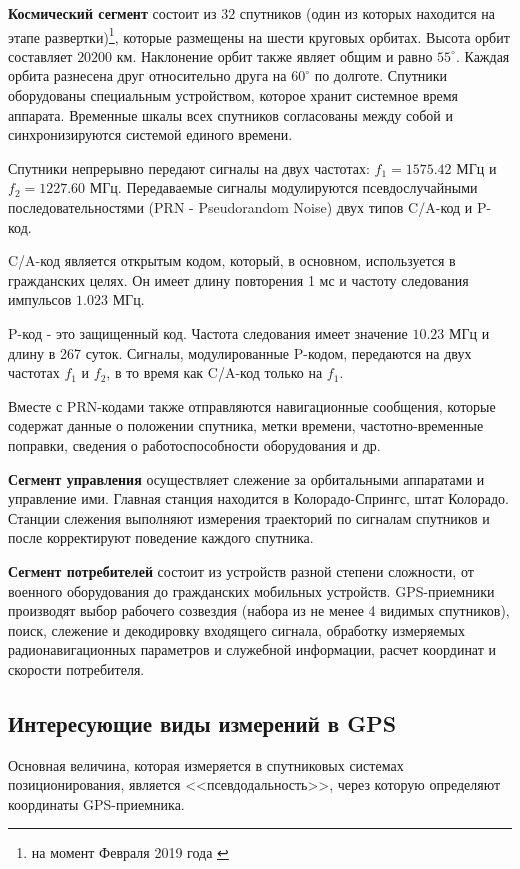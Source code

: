 \documentclass[a4paper]{article}
\begin{document}
\textbf{Космический сегмент} состоит из $32$ спутников (один из которых находится на этапе развертки)\footnote{на момент Февраля 2019 года \cite{gpsgov}}, которые размещены на шести круговых орбитах. Высота орбит составляет $20200$ км. Наклонение орбит также являет общим и равно $55^{\circ}$. Каждая орбита разнесена друг относительно друга на $60^{\circ}$ по долготе. Спутники оборудованы специальным устройством, которое хранит системное время аппарата. Временные шкалы всех спутников согласованы между собой и синхронизируются системой единого времени.

Спутники непрерывно передают сигналы на двух частотах: $f_1 = 1575.42 \text{ МГц}$ и $f_2 = 1227.60 \text{ МГц}$. Передаваемые сигналы модулируются псевдослучайными последовательностями (PRN - Pseudorandom Noise) двух типов C/A-код и P-код.

C/A-код является открытым кодом, который, в основном, используется в гражданских целях. Он имеет длину повторения 1 мс и частоту следования импульсов $1.023 \text{ МГц}$.

P-код - это защищенный код. Частота следования имеет значение $10.23 \text{ МГц}$ и длину в 267 суток. Сигналы, модулированные P-кодом, передаются на двух частотах $f_1$ и $f_2$, в то время как C/A-код только на $f_1$.

Вместе с PRN-кодами также отправляются навигационные сообщения, которые содержат данные о положении спутника, метки времени, частотно-временные поправки, сведения о работоспособности оборудования и др.

\textbf{Сегмент управления} осуществляет слежение за орбитальными аппаратами и управление ими. Главная станция находится в Колорадо-Спрингс, штат Колорадо. Станции слежения выполняют измерения траекторий по сигналам спутников и после корректируют поведение каждого спутника.

\textbf{Сегмент потребителей} состоит из устройств разной степени сложности, от военного оборудования до гражданских мобильных устройств. GPS-приемники производят выбор рабочего созвездия (набора из не менее 4 видимых спутников), поиск, слежение и декодировку входящего сигнала, обработку измеряемых радионавигационных параметров и служебной информации, расчет координат и скорости потребителя.

\newpage
\subsection{Интересующие виды измерений в GPS}
Основная величина, которая измеряется в спутниковых системах позиционирования, является <<псевдодальность>>, через которую определяют координаты GPS-приемника.
\end{document}
